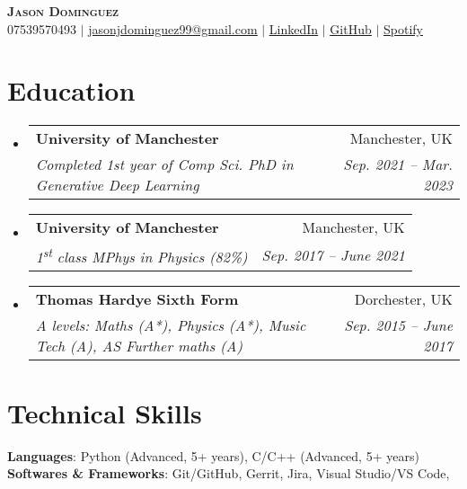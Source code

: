 \documentclass[letterpaper,11pt]{article}
\makeatletter
\newcommand{\resumeSubheading}[4]{
  \vspace{-2pt}\item
    \begin{tabular*}{0.97\textwidth}[t]{l@{\extracolsep{\fill}}r}
      \textbf{#1} & #2 \\
      \textit{\small#3} & \textit{\small #4} \\
    \end{tabular*}\vspace{-7pt}
}
\newcommand{\resumeSubHeadingListStart}{\begin{itemize}[leftmargin=0.15in, label={}]}
\newcommand{\resumeSubHeadingListEnd}{\end{itemize}}
\makeatother
\begin{document}

\begin{center}
    \textbf{\Huge \scshape Jason Dominguez} \\ \vspace{1pt}
    \small 07539570493 $|$ \href{mailto:jasonjdominguez99@gmail.com}{\underline{jasonjdominguez99@gmail.com}} $|$ 
    \href{https://www.linkedin.com/in/jasonjdominguez99/}{\underline{LinkedIn}} $|$
    \href{https://github.com/jasonjdominguez99}{\underline{GitHub}} $|$
    \href{https://open.spotify.com/artist/6vROqVU2bVHOp3V4q09ljN?si=fedCBXksTGm1AKXGwlDVHA}{\underline{Spotify}}
\end{center}


\section{Education}
  \resumeSubHeadingListStart
    \resumeSubheading
      {University of Manchester}{Manchester, UK}
      {Completed 1st year of Comp Sci. PhD in Generative Deep Learning}{Sep. 2021 -- Mar. 2023}
    \resumeSubheading
      {University of Manchester}{Manchester, UK}
      {1\textsuperscript{st} class MPhys in Physics (82\%)}{Sep. 2017 -- June 2021}
    \resumeSubheading
      {Thomas Hardye Sixth Form}{Dorchester, UK}
      {A levels: Maths (A*), Physics (A*), Music Tech (A), AS Further maths (A)}{Sep. 2015 -- June 2017}
  \resumeSubHeadingListEnd

\section{Technical Skills}
 \begin{itemize}[leftmargin=0.15in, label={}]
    \small{\item{
     \textbf{Languages}{: Python (Advanced, 5+ years), C/C++ (Advanced, 5+ years)} \\
     \textbf{Softwares \& Frameworks}{: Git/GitHub, Gerrit, Jira, Visual Studio/VS Code, } \\
     
    }}
 \end{itemize}
 
\end{document}
